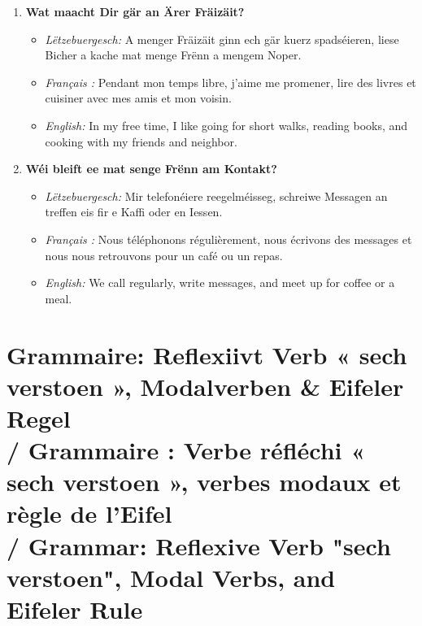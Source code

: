 \begin{enumerate}
    \item \textbf{Wat maacht Dir gär an Ärer Fräizäit?}
    \begin{itemize}
        \item \textit{Lëtzebuergesch:} A menger Fräizäit ginn ech gär kuerz spadséieren, liese Bicher a kache mat menge Frënn a mengem Noper.
        \item \textit{Français :} Pendant mon temps libre, j'aime me promener, lire des livres et cuisiner avec mes amis et mon voisin.
        \item \textit{English:} In my free time, I like going for short walks, reading books, and cooking with my friends and neighbor.
    \end{itemize}

    \item \textbf{Wéi bleift ee mat senge Frënn am Kontakt?}
    \begin{itemize}
        \item \textit{Lëtzebuergesch:} Mir telefonéiere reegelméisseg, schreiwe Messagen an treffen eis fir e Kaffi oder en Iessen.
        \item \textit{Français :} Nous téléphonons régulièrement, nous écrivons des messages et nous nous retrouvons pour un café ou un repas.
        \item \textit{English:} We call regularly, write messages, and meet up for coffee or a meal.
    \end{itemize}
\end{enumerate}

\vspace{1.5em}

\section[Grammaire / Grammar]{Grammaire: Reflexiivt Verb « sech verstoen », Modalverben \& Eifeler Regel \\/ Grammaire : Verbe réfléchi « sech verstoen », verbes modaux et règle de l'Eifel \\/ Grammar: Reflexive Verb "sech verstoen", Modal Verbs, and Eifeler Rule}

